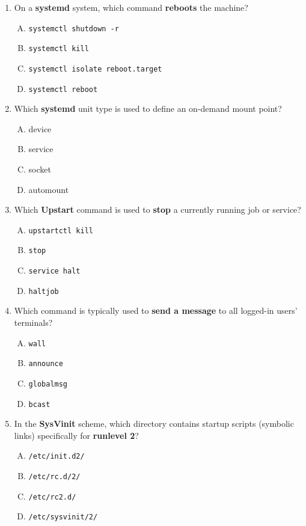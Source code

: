 \documentclass[a4paper]{report}
\begin{document}
\begin{enumerate}[1.]
    \item On a \textbf{systemd} system, which command \textbf{reboots} the machine?
    \begin{enumerate}[A)]
        \item \texttt{systemctl shutdown -r}
        \item \texttt{systemctl kill}
        \item \texttt{systemctl isolate reboot.target}
        \item \texttt{systemctl reboot}
    \end{enumerate}
    
    \item Which \textbf{systemd} unit type is used to define an on-demand mount point?
    \begin{enumerate}[A)]
        \item device
        \item service
        \item socket
        \item automount
    \end{enumerate}
    
    \item Which \textbf{Upstart} command is used to \textbf{stop} a currently running job or service?
    \begin{enumerate}[A)]
        \item \texttt{upstartctl kill}
        \item \texttt{stop}
        \item \texttt{service halt}
        \item \texttt{haltjob}
    \end{enumerate}
    
    \item Which command is typically used to \textbf{send a message} to all logged-in users’ terminals?
    \begin{enumerate}[A)]
        \item \texttt{wall}
        \item \texttt{announce}
        \item \texttt{globalmsg}
        \item \texttt{bcast}
    \end{enumerate}
    
    \item In the \textbf{SysVinit} scheme, which directory contains startup scripts (symbolic links) specifically for \textbf{runlevel 2}?
    \begin{enumerate}[A)]
        \item \texttt{/etc/init.d2/}
        \item \texttt{/etc/rc.d/2/}
        \item \texttt{/etc/rc2.d/}
        \item \texttt{/etc/sysvinit/2/}
    \end{enumerate}
    
\end{enumerate}
\end{document}
